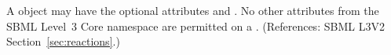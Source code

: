 A \KineticLaw object may have the optional attributes   and
.  No other attributes from the SBML Level~3 Core namespace
are permitted on a \KineticLaw.  (References: SBML L3V2
Section~\ref{sec:reactions}.)
